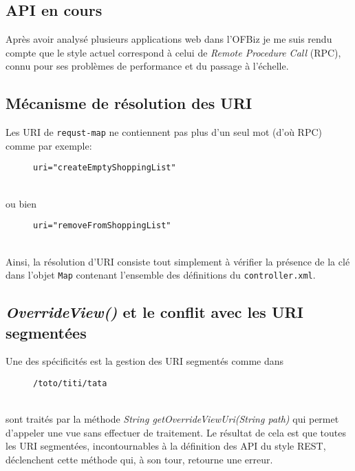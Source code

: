 \subsection{API en cours}
Après avoir analysé plusieurs applications web dans l'OFBiz je me suis rendu compte que le style actuel correspond à celui de \emph{Remote Procedure Call }(RPC), connu pour ses problèmes de performance et du passage à l'échelle. 

\subsection{Mécanisme de résolution des URI}
Les URI de \verb|requst-map| ne contiennent pas plus d'un seul mot (d'où RPC) comme par exemple:
\begin{figure}[h!]
	\begin{lstlisting}[frame=leftline]
uri="createEmptyShoppingList"
	\end{lstlisting}
\end{figure}\\
ou bien \\
\begin{figure}[h!]
	\begin{lstlisting}[frame=leftline]
uri="removeFromShoppingList"
	\end{lstlisting}
\end{figure}\\
Ainsi, la résolution d'URI consiste  tout simplement  à vérifier la présence de la clé dans l'objet \verb|Map| contenant l'ensemble des définitions du \verb|controller.xml|.
    


\subsection{\textit{OverrideView()} et le conflit avec les URI segmentées}
Une des spécificités est la gestion des URI segmentés comme dans \\
\begin{figure}[h!]
	\begin{lstlisting}[frame=leftline]
/toto/titi/tata
	\end{lstlisting}
\end{figure}\\
 sont traités par la méthode \emph{String getOverrideViewUri(String path)} qui permet d'appeler une vue sans effectuer de traitement. Le résultat de cela est que toutes les URI segmentées, incontournables à la définition des API du style REST, déclenchent cette méthode qui, à son tour, retourne une erreur. 

